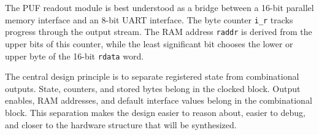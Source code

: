 \documentclass[11pt,a4paper]{article}
\begin{document}
The PUF readout module is best understood as a bridge between a 16-bit parallel memory interface and an 8-bit UART interface. The byte counter \texttt{i\_r} tracks progress through the output stream. The RAM address \texttt{raddr} is derived from the upper bits of this counter, while the least significant bit chooses the lower or upper byte of the 16-bit \texttt{rdata} word.

The central design principle is to separate registered state from combinational outputs. State, counters, and stored bytes belong in the clocked block. Output enables, RAM addresses, and default interface values belong in the combinational block. This separation makes the design easier to reason about, easier to debug, and closer to the hardware structure that will be synthesized.
\end{document}
